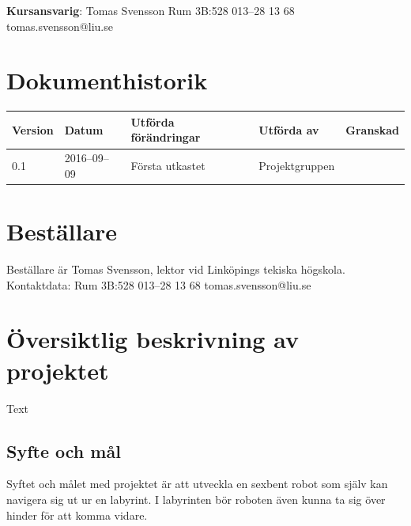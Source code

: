 \documentclass[a4paper,titlepage,12pt]{article}
\begin{document}
\begin{center}
		\centering
		\textbf{Kursansvarig}: Tomas Svensson Rum 3B:528 013--28 13 68 tomas.svensson@liu.se

		\newpage
		\tableofcontents
		\newpage



		\section*{Dokumenthistorik}
		\begin{table}[h]
			\begin{tabular}[pos]{ l l l l l }
				\textbf{Version} & \textbf{Datum} & \textbf{Utförda förändringar} 
				& \textbf{Utförda av} & \textbf{Granskad} \\ \midrule

				0.1 & 2016--09--09 & Första utkastet & Projektgruppen & \\

			\end{tabular}
		\end{table}
	\end{center}


	\newpage

	\section{Beställare}
	Beställare är Tomas Svensson, lektor vid Linköpings tekiska högskola. \\
  Kontaktdata: Rum 3B:528 013–28 13 68 tomas.svensson@liu.se


	\newpage
	\section{Översiktlig beskrivning av projektet}
	Text

	\subsection{Syfte och mål}
	Syftet och målet med projektet är att utveckla en sexbent robot som själv
    kan navigera sig ut ur en labyrint. I labyrinten bör roboten även kunna ta
    sig över hinder för att komma vidare.
\end{document}
